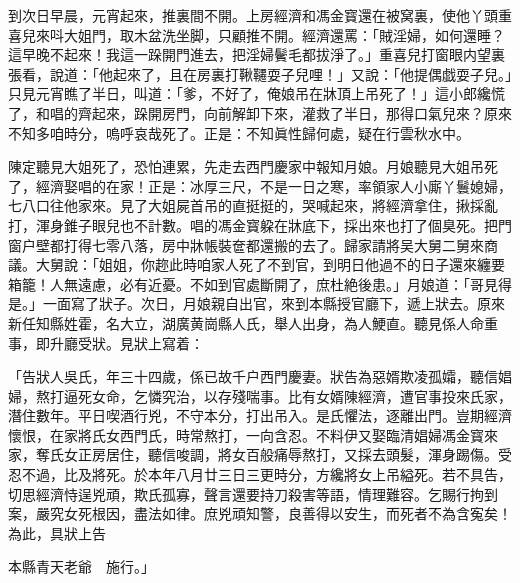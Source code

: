 到次日早晨，元宵起來，推裏間不開。上房經濟和馮金寳還在被窝裏，使他丫頭重喜兒來呌大姐門，取木盆洗坐脚，只顧推不開。經濟還罵：「賊淫婦，如何還睡？這早晚不起來！我這一跺開門進去，把淫婦鬢毛都拔淨了。」重喜兒打窗眼内望裏張看，說道：「他起來了，且在房裏打鞦韆耍子兒哩！」又說：「他提偶戯耍子兒。」只見元宵瞧了半日，叫道：「爹，不好了，俺娘吊在牀頂上吊死了！」這小郎纔慌了，和唱的齊起來，跺開房門，向前解卸下來，灌救了半日，那得口氣兒來？原來不知多咱時分，嗚呼哀哉死了。正是：不知眞性歸何處，疑在行雲秋水中。

陳定聽見大姐死了，恐怕連累，先走去西門慶家中報知月娘。月娘聽見大姐吊死了，經濟娶唱的在家！正是：冰厚三尺，不是一日之寒，率領家人小廝丫鬟媳婦，七八口往他家來。見了大姐屍首吊的直挺挺的，哭喊起來，將經濟拿住，揪採亂打，渾身錐子眼兒也不計數。唱的馮金寳躱在牀底下，採出來也打了個臭死。把門窗户壁都打得七零八落，房中牀帳裝奩都還搬的去了。歸家請將吴大舅二舅來商議。大舅說：「姐姐，你趂此時咱家人死了不到官，到明日他過不的日子還來纏要箱籠！人無遠慮，必有近憂。不如到官處斷開了，庶杜絶後患。」月娘道：「哥見得是。」一面寫了狀子。次日，月娘親自出官，來到本縣授官廳下，遞上狀去。原來新任知縣姓霍，名大立，湖廣黄崗縣人氏，舉人出身，為人鯁直。聽見係人命重事，即升廳受狀。見狀上寫着：

\begin{myquote}[\markfont]
「告狀人吳氏，年三十四歲，係已故千户西門慶妻。狀告為惡婿欺凌孤孀，聽信娼婦，熬打逼死女命，乞憐究治，以存殘喘事。比有女婿陳經濟，遭官事投來氏家，潛住數年。平日喫酒行兇，不守本分，打出吊入。是氏懼法，逐離出門。豈期經濟懷恨，在家將氏女西門氏，時常熬打，一向含忍。不料伊又娶臨清娼婦馮金寳來家，奪氏女正房居住，聽信唆調，將女百般痛辱熬打，又採去頭髮，渾身踢傷。受忍不過，比及將死。於本年八月廿三日三更時分，方纔將女上吊縊死。若不具告，切思經濟恃逞兇頑，欺氏孤寡，聲言還要持刀殺害等語，情理難容。乞賜行拘到案，嚴究女死根因，盡法如律。庶兇頑知警，良善得以安生，而死者不為含寃矣！為此，具狀上告

本縣青天老爺　施行。」
\end{myquote}

